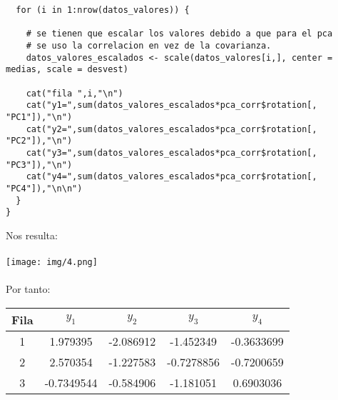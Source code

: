 \begin{sol}
\begin{verbatim}
  for (i in 1:nrow(datos_valores)) {

    # se tienen que escalar los valores debido a que para el pca
    # se uso la correlacion en vez de la covarianza.
    datos_valores_escalados <- scale(datos_valores[i,], center = medias, scale = desvest)

    cat("fila ",i,"\n")
    cat("y1=",sum(datos_valores_escalados*pca_corr$rotation[, "PC1"]),"\n")
    cat("y2=",sum(datos_valores_escalados*pca_corr$rotation[, "PC2"]),"\n")
    cat("y3=",sum(datos_valores_escalados*pca_corr$rotation[, "PC3"]),"\n")
    cat("y4=",sum(datos_valores_escalados*pca_corr$rotation[, "PC4"]),"\n\n")
  }
}
\end{verbatim}
Nos resulta:\\\\
\texttt{[image: img/4.png]}\\\\

Por tanto: 
\begin{table}[ht]
\centering
\begin{tabular}{|c|c|c|c|c|}
\hline
\textbf{Fila} & $y_1$ & $y_2$ & $y_3$ & $y_4$ \\
\hline
1 & 1.979395 & -2.086912 & -1.452349 & -0.3633699 \\
2 & 2.570354 & -1.227583 & -0.7278856 & -0.7200659 \\
3 & -0.7349544 & -0.584906 & -1.181051 & 0.6903036 \\
\hline
\end{tabular}
\end{table}

\end{sol}
